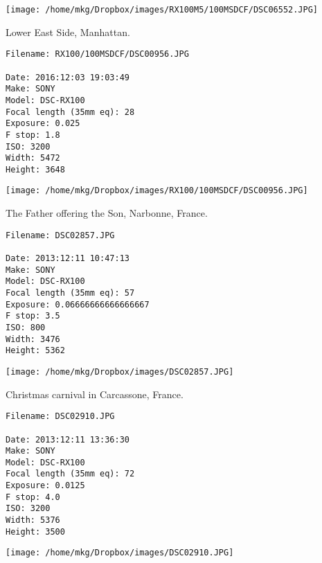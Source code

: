 \begin{landscape}

\texttt{[image: /home/mkg/Dropbox/images/RX100M5/100MSDCF/DSC06552.JPG]}
\end{landscape}



\noindent Lower East Side, Manhattan.
\begin{lstlisting}
Filename: RX100/100MSDCF/DSC00956.JPG

Date: 2016:12:03 19:03:49
Make: SONY
Model: DSC-RX100
Focal length (35mm eq): 28
Exposure: 0.025
F stop: 1.8
ISO: 3200
Width: 5472
Height: 3648
\end{lstlisting}

\begin{landscape}

\texttt{[image: /home/mkg/Dropbox/images/RX100/100MSDCF/DSC00956.JPG]}
\end{landscape}



\noindent The Father offering the Son, Narbonne, France.
\begin{lstlisting}
Filename: DSC02857.JPG

Date: 2013:12:11 10:47:13
Make: SONY
Model: DSC-RX100
Focal length (35mm eq): 57
Exposure: 0.06666666666666667
F stop: 3.5
ISO: 800
Width: 3476
Height: 5362
\end{lstlisting}

\clearpage

\texttt{[image: /home/mkg/Dropbox/images/DSC02857.JPG]}
\clearpage


\noindent Christmas carnival in Carcassone, France.
\begin{lstlisting}
Filename: DSC02910.JPG

Date: 2013:12:11 13:36:30
Make: SONY
Model: DSC-RX100
Focal length (35mm eq): 72
Exposure: 0.0125
F stop: 4.0
ISO: 3200
Width: 5376
Height: 3500
\end{lstlisting}

\begin{landscape}

\texttt{[image: /home/mkg/Dropbox/images/DSC02910.JPG]}
\end{landscape}



